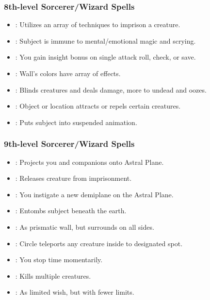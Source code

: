 \subsubsection{8th-level Sorcerer/Wizard Spells}
\begin{itemize}
\item {}: Utilizes an array of techniques to imprison a creature.
\item {}: Subject is immune to mental/emotional magic and scrying.
\item {}: You gain insight bonus on single attack roll, check, or save.
\item {}: Wall's colors have array of effects.
\item {}: Blinds creatures and deals damage, more to undead and oozes.
\item {}: Object or location attracts or repels certain creatures.
\item {}: Puts subject into suspended animation.
\end{itemize}
\subsubsection{9th-level Sorcerer/Wizard Spells}
\begin{itemize}
\item {}: Projects you and companions onto Astral Plane.
\item {}: Releases creature from imprisonment.
\item {}: You instigate a new demiplane on the Astral Plane.
\item {}: Entombs subject beneath the earth.
\item {}: As prismatic wall, but surrounds on all sides.
\item {}: Circle teleports any creature inside to designated spot.
\item {}: You stop time momentarily.
\item {}: Kills multiple creatures.
\item {}: As limited wish, but with fewer limits.
\end{itemize}
